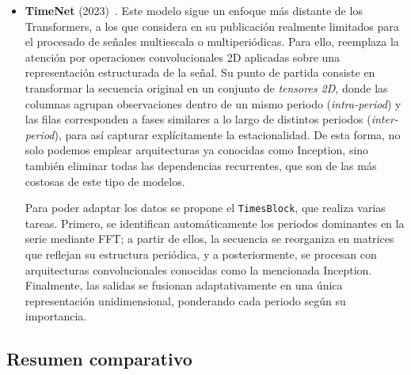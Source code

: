 {\begin{itemize}
    El modelo aplica self-attention entre parches completos, lo que favorece la detección de dependencias de largo alcance. Para preservar la información temporal se utilizan \textit{embeddings posicionales}, y en el caso de series multivariantes, se adopta una estrategia \textit{channel-independent} que procesa cada variable por separado para modelarlas.

    Curiosamente, prescinde de decoder, debido al uso de una capa lineal proyectada directamente desde la salida del encoder, evitando así arquitecturas y mejorando el rendimiento gracias al no operar la salida punto a punto, sino como secuencia completa.

    \item \textbf{TimeNet} (2023)~\cite{wu2023timesnettemporal2dvariationmodeling}. Este modelo sigue un enfoque más distante de los Transformers, a los que considera en su publicación realmente limitados para el procesado de señales multiescala o multiperiódicas. Para ello, reemplaza la atención por operaciones convolucionales 2D aplicadas sobre una representación estructurada de la señal. Su punto de partida consiste en transformar la secuencia original en un conjunto de \textit{tensores 2D}, donde las columnas agrupan observaciones dentro de un mismo periodo (\textit{intra-period}) y las filas corresponden a fases similares a lo largo de distintos periodos (\textit{inter-period}), para así capturar explícitamente la estacionalidad. De esta forma, no solo podemos emplear arquitecturas ya conocidas como Inception, sino también eliminar todas las dependencias recurrentes, que son de las más costosas de este tipo de modelos.

    Para poder adaptar los datos se propone el \texttt{TimesBlock}, que realiza varias tareas. Primero, se identifican automáticamente los periodos dominantes en la serie mediante FFT; a partir de ellos, la secuencia se reorganiza en matrices que reflejan su estructura periódica, y a posteriormente, se procesan con arquitecturas convolucionales conocidas como la mencionada Inception. Finalmente, las salidas se fusionan adaptativamente en una única representación unidimensional, ponderando cada periodo según su importancia.

\end{itemize}

\subsection{Resumen comparativo}

}

